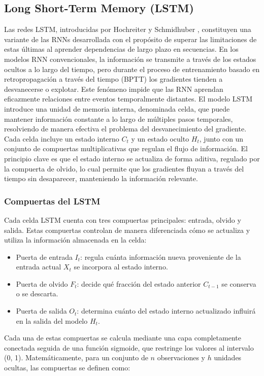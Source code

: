 \subsection{Long Short-Term Memory (LSTM)}
\justify
Las redes LSTM, introducidas por Hochreiter y Schmidhuber \cite{hochreiter1997long}, constituyen una variante de las RNNs desarrollada con el propósito de superar las limitaciones de estas últimas al aprender dependencias de largo plazo en secuencias.
En los modelos RNN convencionales, la información se transmite a través de los estados ocultos a lo largo del tiempo, pero durante el proceso de entrenamiento basado en retropropagación a través del tiempo (BPTT) los gradientes tienden a desvanecerse o explotar.
Este fenómeno impide que las RNN aprendan eficazmente relaciones entre eventos temporalmente distantes.
\justify
El modelo LSTM introduce una unidad de memoria interna, denominada celda, que puede mantener información constante a lo largo de múltiples pasos temporales, resolviendo de manera efectiva el problema del desvanecimiento del gradiente.
Cada celda incluye un estado interno $C_t$ y un estado oculto $H_t$, junto con un conjunto de compuertas multiplicativas que regulan el flujo de información.
\justify
El principio clave es que el estado interno se actualiza de forma aditiva, regulado por la compuerta de olvido, lo cual permite que los gradientes fluyan a través del tiempo sin desaparecer, manteniendo la información relevante.
\subsubsection{Compuertas del LSTM}
\justify
Cada celda LSTM cuenta con tres compuertas principales: entrada, olvido y salida.
\justify
Estas compuertas controlan de manera diferenciada cómo se actualiza y utiliza la información almacenada en la celda:

\begin{itemize}
\item Puerta de entrada $I_t$: regula cuánta información nueva proveniente de la entrada actual $X_t$ se incorpora al estado interno.
\item  Puerta de olvido $F_t$: decide qué fracción del estado anterior $C_{t-1}$ se conserva o se descarta.
\item  Puerta de salida $O_t$: determina cuánto del estado interno actualizado influirá en la salida del modelo $H_t$.
\end{itemize}

\justify
Cada una de estas compuertas se calcula mediante una capa completamente conectada seguida de una función sigmoide, que restringe los valores al intervalo (0, 1). Matemáticamente, para un conjunto de $n$ observaciones y $h$ unidades ocultas, las compuertas se definen como:

